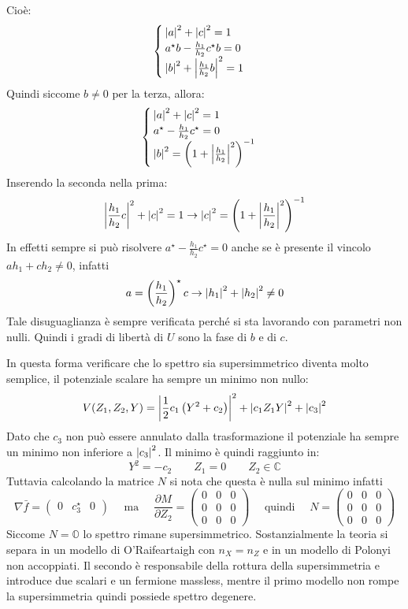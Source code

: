 \documentclass[]{scrartcl}
\begin{document}
Cioè:
\[
  \begin{cases}
    \abs{a}^2 + \abs{c}^2 = 1 \\
    a^\star b - \frac{h_1}{h_2}c^\star b = 0 \\
    \abs{b}^2 + \abs{\frac{h_1}{h_2}b}^2 = 1
  \end{cases}
\]
Quindi siccome $ b \not = 0 $ per la terza, allora:
\[
  \begin{cases}
    \abs{a}^2 + \abs{c}^2 = 1 \\
    a^\star- \frac{h_1}{h_2}c^\star = 0 \\
    \abs{b}^2 = \left(1 + \abs{\frac{h_1}{h_2}}^2 \right)^{-1}
  \end{cases}
\]
Inserendo la seconda nella prima:
\[
  \abs{\frac{h_1}{h_2}c}^2 + \abs{c}^2 = 1 \rightarrow \abs{c}^2 = \left(1 + \abs{\frac{h_1}{h_2}}^2 \right)^{-1}
\]
In effetti sempre si può risolvere $ a^\star- \frac{h_1}{h_2}c^\star = 0 $ anche se è presente il vincolo $ a h_1 + c h_2 \not = 0 $, infatti
\[
  a = \left(\frac{h_1}{h_2}\right)^\star c \rightarrow \abs{h_1}^2 + \abs{h_2}^2 \not = 0
\]
Tale disuguaglianza è sempre verificata perché si sta lavorando con parametri non nulli. Quindi i gradi di libertà di $ U $ sono la fase di $ b $ e di $ c $.

In questa forma verificare che lo spettro sia supersimmetrico diventa molto semplice, il potenziale scalare ha sempre un minimo non nullo:
\[
  V(Z_1, Z_2, Y) = \abs{\frac{1}{2}c_1 \left( Y^2 + c_2 \right)}^2 + \abs{c_1 Z_1 Y}^2 + \abs{c_3}^2
\]
Dato che $ c_3 $ non può essere annulato dalla trasformazione il potenziale ha sempre un minimo non inferiore a $ \abs{c_3}^2 $.
Il minimo è quindi raggiunto in:
\[
  Y^2 = -c_2 \qquad Z_1 = 0 \qquad Z_2 \in \mathbb{C}
\]
Tuttavia calcolando la matrice $ N $ si nota che questa è nulla sul minimo infatti
\[
  \nabla \bar{f} =
  \begin{pmatrix}
    0 & c_3^\star & 0
  \end{pmatrix}
  \quad
  \text{ ma }
  \quad
  \frac{\partial M}{\partial Z_2} =
  \begin{pmatrix}
    0 & 0 & 0 \\
    0 & 0 & 0 \\
    0 & 0 & 0
  \end{pmatrix}
  \quad
  \text{ quindi }
  \quad
  N =
  \begin{pmatrix}
    0 & 0 & 0 \\
    0 & 0 & 0 \\
    0 & 0 & 0
  \end{pmatrix}
\]
Siccome $ N = \mathbb{O} $ lo spettro rimane supersimmetrico.
Sostanzialmente la teoria si separa in un modello di O'Raifeartaigh con $ n_X = n_Z $ e in un modello di Polonyi non accoppiati.
Il secondo è responsabile della rottura della supersimmetria e introduce due scalari e un fermione massless, mentre il primo modello non rompe
la supersimmetria quindi possiede spettro degenere.
\end{document}
